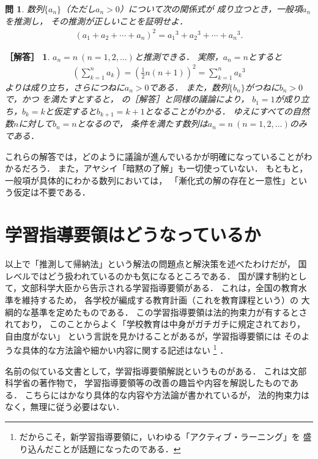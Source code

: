 \documentclass[11pt,a4paper]{ltjsarticle} %
\theoremstyle{mystyle} %
\newtheorem{que}{問} %
\newtheorem*{ans}{［解答］} %
\begin{document}
\begin{que} \label{que:suisokuchert2kai}
	数列$\{ a_n \}$（ただし$a_n > 0$）について次の関係式が
	成り立つとき，一般項$a_n$を推測し，
	その推測が正しいことを証明せよ．
	\begin{align}
		( a_1 + a_2 + \cdots + a_n )^2 =
		{a_1} ^3 + {a_2} ^3 + \cdots + {a_n } ^3 .
		\label{eq:suisoku2kai}
	\end{align}
\end{que}


\begin{ans}
	$a_n = n \ (n= 1,2, \ldots)$と推測できる．
	実際，$a_n = n$とすると
	\begin{align*}
		\left( \sum_{k=1}^{n} a_k \right) = \left( \frac{1}{2} n(n+1) \right) ^2
		= \sum_{k=1}^{n} {a_k}^3
	\end{align*}
	よりは成り立ち，さらにつねに$a_n > 0$である．
	また，数列$\{ b_n \}$がつねに$b_n > 0$で，かつ
	を満たすとすると，
	の［解答］と同様の議論により，
	$b_1=1$が成り立ち，$b_k=k$と仮定すると$b_{k+1} = k+1$となることがわかる．
	ゆえにすべての自然数$n$に対して$b_n=n$となるので，
	条件を満たす数列は$a_n = n \ (n=1,2,\ldots)$のみである．
\end{ans}

これらの解答では，どのように議論が進んでいるかが明確になっていることがわかるだろう．
また，アヤシイ「暗黙の了解」も一切使っていない．
もともと，一般項が具体的にわかる数列においては，
「漸化式の解の存在と一意性」という仮定は不要である．




\section{学習指導要領はどうなっているか}
以上で「推測して帰納法」という解法の問題点と解決策を述べたわけだが，
国レベルではどう扱われているのかも気になるところである．
国が課す制約として，文部科学大臣から告示される学習指導要領がある．
これは，全国の教育水準を維持するため，
各学校が編成する教育計画（これを教育課程という）の
大綱的な基準を定めたものである\cite{monkasyo}．
この学習指導要領は法的拘束力が有するとされており，
このことからよく「学校教育は中身がガチガチに規定されており，自由度がない」
という言説を見かけることがあるが，学習指導要領には
そのような具体的な方法論や細かい内容に関する記述はない
\footnote{
	だからこそ，新学習指導要領に，いわゆる「アクティブ・ラーニング」を
	盛り込んだことが話題になったのである．
}
．

名前の似ている文書として，学習指導要領解説というものがある．
これは文部科学省の著作物で，
学習指導要領等の改善の趣旨や内容を解説したものである\cite{monkasyo}．
こちらにはかなり具体的な内容や方法論が書かれているが，
法的拘束力はなく，無理に従う必要はない．
\end{document}
